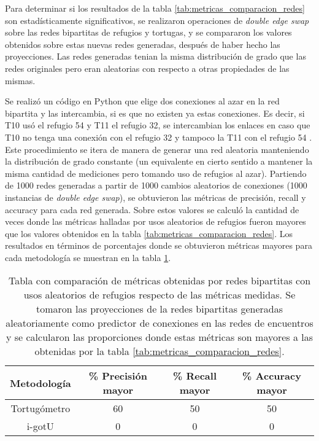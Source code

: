 Para determinar si los resultados de la tabla \ref{tab:metricas_comparacion_redes} son estadísticamente significativos, se realizaron operaciones de \textit{double edge swap} \cite{bipartitasTortusPaper} sobre las redes bipartitas de refugios y tortugas, y se compararon los valores obtenidos sobre estas nuevas redes generadas, después de haber hecho las proyecciones. Las redes generadas tenian la misma distribución de grado que las redes originales pero eran aleatorias con respecto a otras propiedades de las mismas. 

Se realizó un código en Python que elige dos conexiones al azar en la red bipartita y las intercambia, si es que no existen ya estas conexiones. Es decir, si T10 usó el refugio 54 y T11 el refugio 32, se intercambian los enlaces en caso que T10 no tenga una conexión con el refugio 32 y tampoco la T11 con el refugio 54 \cite{github}. Este procedimiento se itera de manera de generar una red aleatoria manteniendo la distribución de grado constante (un equivalente en cierto sentido a mantener la misma cantidad de mediciones pero tomando uso de refugios al azar). Partiendo de 1000 redes generadas a partir de 1000 cambios aleatorios de conexiones (1000 instancias de \textit{double edge swap}), se obtuvieron las métricas de precisión, recall y accuracy para cada red generada. Sobre estos valores se calculó la cantidad de veces donde las métricas halladas por usos aleatorios de refugios fueron mayores que los valores obtenidos  en la tabla \ref{tab:metricas_comparacion_redes}. Los resultados en términos de porcentajes donde se obtuvieron métricas mayores para cada metodología se muestran en la tabla \ref{tab:metricas_comparacion_redes_aleatorias}.
\begin{table}[ht]
    \centering
    \begin{tabular}{|c|c|c|c|}
       
   \hline
    Metodología  & \% Precisión mayor  &  \% Recall mayor & \% Accuracy mayor \\ \hline
    Tortugómetro & 60    & 50  & 50    \\ \hline
    i-gotU       & 0        & 0    & 0      \\ \hline
   
    \end{tabular}
    \caption[Tabla con comparación de métricas obtenidas en redes bipartitas con usos aleatorios de refugios respecto a las métricas medidas.]{Tabla con comparación de métricas obtenidas por redes bipartitas con usos aleatorios de refugios respecto de las métricas medidas. Se tomaron las proyecciones de la redes bipartitas generadas aleatoriamente como predictor de conexiones en las redes de encuentros y se calcularon las proporciones donde estas métricas son mayores a las obtenidas por la tabla \ref{tab:metricas_comparacion_redes}.}
    \label{tab:metricas_comparacion_redes_aleatorias}
\end{table}

